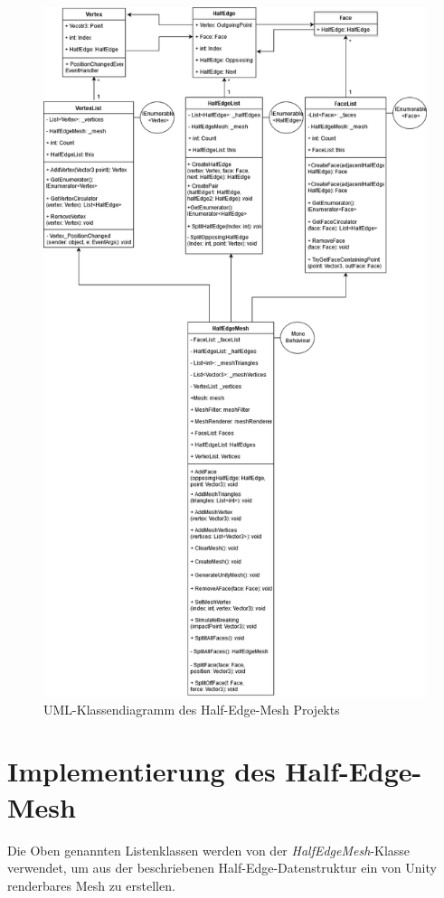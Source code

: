 \begin{figure}[h]
	\centering
	\includegraphics[width=0.7\linewidth]{Images/ClassDiagramHalfEdgeMesh}
	\caption[HalfEdgeMeshUMLDiagramm]{UML-Klassendiagramm des Half-Edge-Mesh Projekts}
	\label{fig:classdiagramhalfedgemesh}
\end{figure}


\section{Implementierung des Half-Edge-Mesh}
Die Oben genannten Listenklassen werden von der \textit{HalfEdgeMesh}-Klasse verwendet, um aus der beschriebenen Half-Edge-Datenstruktur ein von Unity renderbares Mesh zu erstellen. 